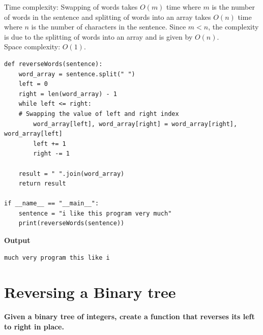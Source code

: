\documentclass[a4paper,11pt]{book}
\begin{document}
\noindent Time complexity: Swapping of words takes $O(m)$ time where $m$ is the number of words in the sentence and splitting of words into an array takes $O(n)$ time where $n$ is the number of characters in the sentence. Since $m<n$, the complexity is due to the splitting of words into an array and is given by $O(n)$.\\
\noindent Space complexity: $O(1)$.
\begin{lstlisting}
def reverseWords(sentence):
    word_array = sentence.split(" ")
    left = 0
    right = len(word_array) - 1
    while left <= right:
    # Swapping the value of left and right index
        word_array[left], word_array[right] = word_array[right], word_array[left]
        left += 1
        right -= 1

    result = " ".join(word_array)
    return result

if __name__ == "__main__":
    sentence = "i like this program very much"
    print(reverseWords(sentence))
\end{lstlisting}
\textbf{Output}
\begin{lstlisting}
much very program this like i
\end{lstlisting}

\newpage
\section{Reversing a Binary tree}

\textbf{Given a binary tree of integers, create a function that reverses its left to right in place.}
\vspace{5mm}

\begin{center}
\vspace{7mm}
\end{center}
\end{document}
